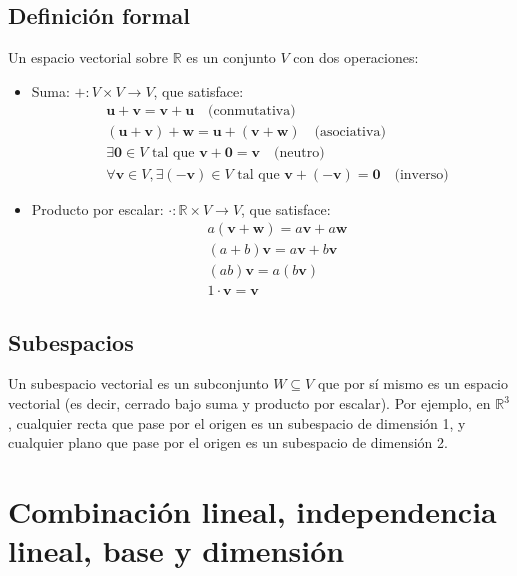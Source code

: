 \documentclass[12pt,a4paper,openany,oneside]{book}
\begin{document}
\subsection{Definición formal}
Un espacio vectorial sobre $\mathbb{R}$ es un conjunto $V$ con dos operaciones:
\begin{itemize}
    \item Suma: $+ : V \times V \to V$, que satisface:
    \begin{align*}
        &\mathbf{u} + \mathbf{v} = \mathbf{v} + \mathbf{u} \quad \text{(conmutativa)}\\
        &(\mathbf{u} + \mathbf{v}) + \mathbf{w} = \mathbf{u} + (\mathbf{v} + \mathbf{w}) \quad \text{(asociativa)}\\
        &\exists \mathbf{0} \in V \text{ tal que } \mathbf{v} + \mathbf{0} = \mathbf{v} \quad \text{(neutro)}\\
        &\forall \mathbf{v} \in V, \exists (-\mathbf{v}) \in V \text{ tal que } \mathbf{v} + (-\mathbf{v}) = \mathbf{0} \quad \text{(inverso)}
    \end{align*}
    \item Producto por escalar: $\cdot : \mathbb{R} \times V \to V$, que satisface:
    \begin{align*}
        &a(\mathbf{v} + \mathbf{w}) = a\mathbf{v} + a\mathbf{w}\\
        &(a+b)\mathbf{v} = a\mathbf{v} + b\mathbf{v}\\
        &(ab)\mathbf{v} = a(b\mathbf{v})\\
        &1 \cdot \mathbf{v} = \mathbf{v}
    \end{align*}
\end{itemize}

\subsection{Subespacios}
Un subespacio vectorial es un subconjunto $W \subseteq V$ que por sí mismo es un espacio vectorial (es decir, cerrado bajo suma y producto por escalar). Por ejemplo, en $\mathbb{R}^3$, cualquier recta que pase por el origen es un subespacio de dimensión 1, y cualquier plano que pase por el origen es un subespacio de dimensión 2.

\section{Combinación lineal, independencia lineal, base y dimensión}
\end{document}
